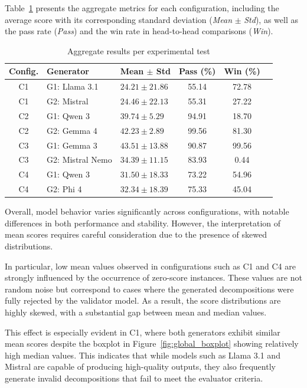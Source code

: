 \documentclass[pdflatex,sn-mathphys-num]{sn-jnl}%
\theoremstyle{thmstyleone}%
\theoremstyle{thmstyletwo}%
\theoremstyle{thmstylethree}%
\begin{document}
Table~\ref{tab:global_results} presents the aggregate metrics for each configuration, including the average score with its corresponding standard deviation (\textit{Mean} $\pm$ \textit{Std}), as well as the pass rate (\textit{Pass}) and the win rate in head-to-head comparisons (\textit{Win}).

\begin{table}[ht]
\centering
\caption{Aggregate results per experimental test}
\label{tab:global_results}
\begin{tabular}{cllccc}
\toprule
Config. & Generator & Mean $\pm$ Std & Pass (\%) & Win (\%) \\
\midrule
C1 & G1: Llama 3.1 & $24.21 \pm 21.86$ & 55.14 & 72.78 \\
C1 & G2: Mistral & $24.46 \pm 22.13$ & 55.31 & 27.22 \\
\midrule
C2 & G1: Qwen 3 & $39.74 \pm 5.29$ & 94.91 & 18.70 \\
C2 & G2: Gemma 4 & $42.23 \pm 2.89$ & 99.56 & 81.30 \\
\midrule
C3 & G1: Gemma 3 & $43.51 \pm 13.88$ & 90.87 & 99.56 \\
C3 & G2: Mistral Nemo & $34.39 \pm 11.15$ & 83.93 & 0.44 \\
\midrule
C4 & G1: Qwen 3 & $31.50 \pm 18.33$ & 73.22 & 54.96 \\
C4 & G2: Phi 4 & $32.34 \pm 18.39$ & 75.33 & 45.04 \\
\bottomrule
\end{tabular}
\end{table}

Overall, model behavior varies significantly across configurations, with notable differences in both performance and stability. However, the interpretation of mean scores requires careful consideration due to the presence of skewed distributions.

In particular, low mean values observed in configurations such as C1 and C4 are strongly influenced by the occurrence of zero-score instances. These values are not random noise but correspond to cases where the generated decompositions were fully rejected by the validator model. As a result, the score distributions are highly skewed, with a substantial gap between mean and median values.

This effect is especially evident in C1, where both generators exhibit similar mean scores despite the boxplot in Figure~\ref{fig:global_boxplot} showing relatively high median values. This indicates that while models such as Llama 3.1 and Mistral are capable of producing high-quality outputs, they also frequently generate invalid decompositions that fail to meet the evaluator criteria.
\end{document}
